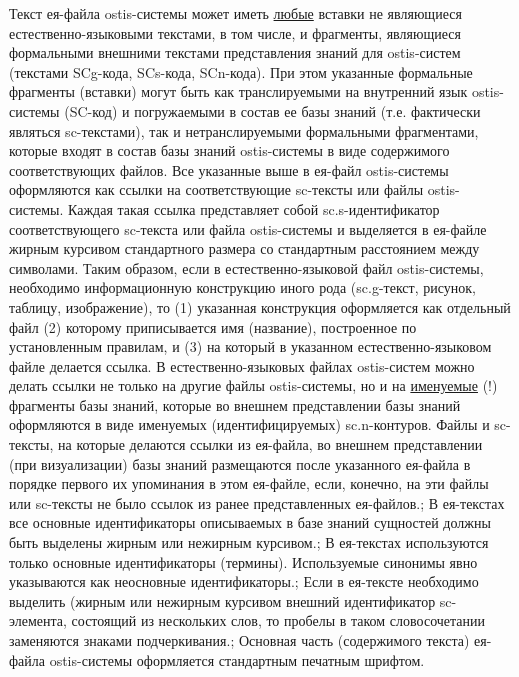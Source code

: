 \begin{SCn}
{Текст ея-файла ostis-системы может иметь \uline{любые} вставки не являющиеся естественно-языковыми текстами, в том числе, и фрагменты, являющиеся формальными внешними текстами представления знаний для ostis-систем (текстами SCg-кода, SCs-кода, SCn-кода). При этом указанные формальные фрагменты (вставки) могут быть как транслируемыми на внутренний язык ostis-системы (SC-код) и погружаемыми в состав ее базы знаний (т.е. фактически являться sc-текстами), так и нетранслируемыми формальными фрагментами, которые входят в состав базы знаний ostis-системы в виде содержимого соответствующих файлов. Все указанные выше  в ея-файл ostis-системы оформляются как ссылки на соответствующие sc-тексты или файлы ostis-системы. Каждая такая ссылка представляет собой sc.s-идентификатор соответствующего sc-текста или файла ostis-системы и выделяется в ея-файле жирным курсивом стандартного размера со стандартным расстоянием между символами.
Таким образом, если в естественно-языковой файл ostis-системы, необходимо  информационную конструкцию иного рода (sc.g-текст, рисунок, таблицу, изображение), то (1) указанная конструкция оформляется как отдельный файл (2) которому приписывается имя (название), построенное по установленным правилам, и (3) на который в указанном естественно-языковом файле делается ссылка.
В естественно-языковых файлах ostis-систем можно делать ссылки не только на другие файлы ostis-системы, но и на \uline{именуемые} (!) фрагменты базы знаний, которые во внешнем представлении базы знаний оформляются в виде именуемых (идентифицируемых) sc.n-контуров.
Файлы и sc-тексты, на которые делаются ссылки из ея-файла, во внешнем представлении (при визуализации) базы знаний размещаются после указанного ея-файла в порядке первого их упоминания в этом ея-файле, если, конечно, на эти файлы или sc-тексты не было ссылок из ранее представленных ея-файлов.;
В ея-текстах все основные идентификаторы описываемых в базе знаний сущностей должны быть выделены жирным или нежирным курсивом.;
В ея-текстах используются только основные идентификаторы (термины). Используемые синонимы явно указываются как неосновные идентификаторы.;
Если в ея-тексте необходимо выделить (жирным или нежирным курсивом внешний идентификатор sc-элемента, состоящий из нескольких слов, то пробелы в таком словосочетании заменяются знаками подчеркивания.;
Основная часть (содержимого текста) ея-файла ostis-системы оформляется стандартным печатным шрифтом.
}
\filemodefalse



\end{SCn}
